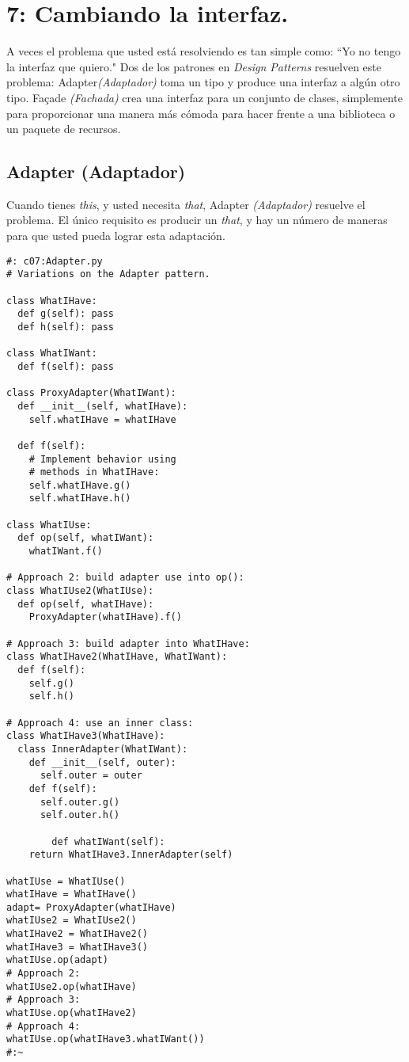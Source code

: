 \section*{7: Cambiando la interfaz.}
\label{sec:cli}

A veces el problema que usted está resolviendo es tan simple como: “Yo no tengo la interfaz que quiero." Dos de los patrones en \textit{Design Patterns} resuelven este problema: Adapter\textit{(Adaptador)} toma un tipo y produce una interfaz a algún otro tipo. Façade \textit{(Fachada)} crea una interfaz para un conjunto de clases, simplemente para proporcionar una manera más cómoda para hacer frente a una biblioteca o un paquete de recursos.


\subsection*{Adapter (Adaptador)}
\label{subsec:Adapter}


Cuando tienes \textit{this}, y usted necesita \textit{that}, Adapter \textit{(Adaptador)} resuelve el problema. El único requisito es producir un \textit{that}, y hay un número de maneras para que usted pueda lograr esta adaptación.

\begin{lstlisting} 
#: c07:Adapter.py 
# Variations on the Adapter pattern.

class WhatIHave: 
  def g(self): pass 
  def h(self): pass 
  
class WhatIWant: 
  def f(self): pass 
  
class ProxyAdapter(WhatIWant): 
  def __init__(self, whatIHave): 
    self.whatIHave = whatIHave 
    
  def f(self): 
    # Implement behavior using  
    # methods in WhatIHave: 
    self.whatIHave.g() 
    self.whatIHave.h() 
    
class WhatIUse: 
  def op(self, whatIWant): 
    whatIWant.f() 
    
# Approach 2: build adapter use into op(): 
class WhatIUse2(WhatIUse): 
  def op(self, whatIHave): 
    ProxyAdapter(whatIHave).f() 
    
# Approach 3: build adapter into WhatIHave: 
class WhatIHave2(WhatIHave, WhatIWant): 
  def f(self): 
    self.g() 
    self.h() 
    
# Approach 4: use an inner class: 
class WhatIHave3(WhatIHave): 
  class InnerAdapter(WhatIWant): 
    def __init__(self, outer): 
      self.outer = outer 
    def f(self): 
      self.outer.g() 
      self.outer.h() 
      
        def whatIWant(self):  
    return WhatIHave3.InnerAdapter(self) 
    
whatIUse = WhatIUse() 
whatIHave = WhatIHave() 
adapt= ProxyAdapter(whatIHave) 
whatIUse2 = WhatIUse2() 
whatIHave2 = WhatIHave2() 
whatIHave3 = WhatIHave3() 
whatIUse.op(adapt) 
# Approach 2: 
whatIUse2.op(whatIHave) 
# Approach 3: 
whatIUse.op(whatIHave2) 
# Approach 4: 
whatIUse.op(whatIHave3.whatIWant()) 
#:~ 
\end{lstlisting}

